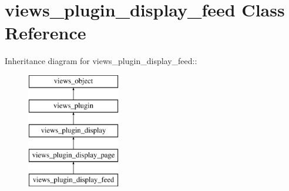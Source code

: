 \hypertarget{classviews__plugin__display__feed}{
\section{views\_\-plugin\_\-display\_\-feed Class Reference}
\label{classviews__plugin__display__feed}
}
Inheritance diagram for views\_\-plugin\_\-display\_\-feed::\begin{figure}[H]
\begin{center}
\leavevmode
\includegraphics[height=5cm]{classviews__plugin__display__feed}
\end{center}
\end{figure}
